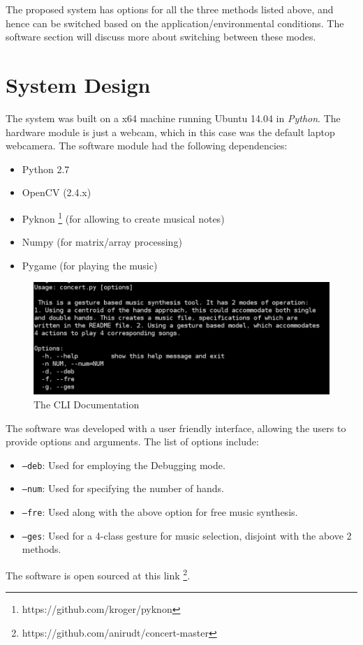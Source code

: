 \documentclass[letterpaper, 10 pt, twoside, conference]{ieeeconf}
\begin{document}
The proposed system has options for all the three methods listed above, and hence can be switched based
on the application/environmental conditions. The software section will discuss more about switching between these modes.

\section{System Design}
The system was built on a x64 machine running Ubuntu 14.04 in \textit{Python}. The hardware module is just a webcam,
which in this case was the default laptop webcamera. The software module had the following dependencies:
\begin{itemize}
  \item Python 2.7
  \item OpenCV (2.4.x)
  \item Pyknon \footnote{https://github.com/kroger/pyknon} (for allowing to create musical notes)
  \item Numpy (for matrix/array processing)
  \item Pygame (for playing the music)
\end{itemize}
\begin{figure}[h]
  \centering
  \includegraphics[width=\columnwidth]{concert.png}
  \caption{The CLI Documentation}
  \label{Overall1}
\end{figure}
The software was developed with a user friendly interface, allowing the users to provide
options and arguments. The list of options include:
\begin{itemize}
  \item \texttt{--deb}: Used for employing the Debugging mode.
  \item \texttt{--num}: Used for specifying the number of hands.
  \item \texttt{--fre}: Used along with the above option for free music synthesis.
  \item \texttt{--ges}: Used for a 4-class gesture for music selection, disjoint with the
    above 2 methods.
\end{itemize}
The software is open sourced at this link \footnote{https://github.com/anirudt/concert-master}.
\end{document}
